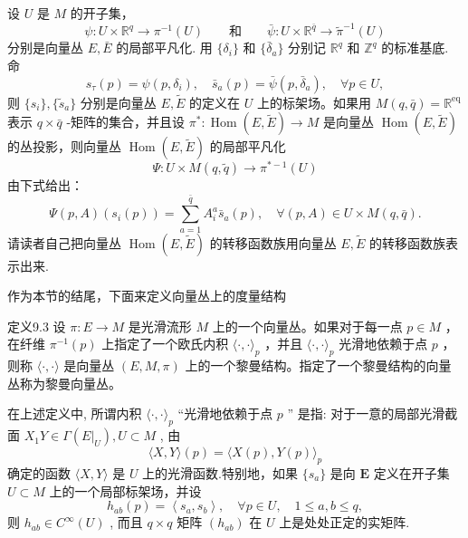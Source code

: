 设  $U$  是  $M$  的开子集，
$$
\psi : U \times \mathbb {R} ^ {q} \to \pi^ {- 1} (U) \qquad {\text {和}} \qquad \bar {\psi}: U \times \mathbb {R} ^ {\bar {q}} \to \tilde {\pi} ^ {- 1} (U)
$$
分别是向量丛  $E, \bar{E}$  的局部平凡化. 用  $\{\delta_i\}$  和  $\{\bar{\delta}_a\}$  分别记  $\mathbb{R}^q$  和  $\mathbb{Z}^q$  的标准基底. 命
$$
s _ {\tau} (p) = \psi (p, \delta_ {i}), \quad \bar {s} _ {a} (p) = \bar {\psi} (p, \bar {\delta} _ {a}), \quad \forall p \in U,
$$
则  $\{s_i\}, \{\tilde{s}_a\}$  分别是向量丛  $E, \tilde{E}$  的定义在  $U$  上的标架场。如果用  $M(q, \bar{q}) = \mathbb{R}^{\mathrm{eq}}$  表示  $q \times \bar{q}$ -矩阵的集合，并且设  $\pi^{*}: \operatorname{Hom}(E, \tilde{E}) \to M$  是向量丛  $\operatorname{Hom}(E, \tilde{E})$  的丛投影，则向量丛  $\operatorname{Hom}(E, \tilde{E})$  的局部平凡化
$$
\Psi : U \times M (q, \tilde {q}) \rightarrow \pi^ {* - 1} (U)
$$
由下式给出：
$$
\Psi (p, A) (s _ {i} (p)) = \sum_ {a = 1} ^ {\bar {q}} A _ {i} ^ {a} \bar {s} _ {a} (p), \quad \forall (p, A) \in U \times M (q, \bar {q}).
$$
请读者自己把向量丛  $\operatorname{Hom}(E, \tilde{E})$  的转移函数族用向量丛  $E, \tilde{E}$  的转移函数族表示出来.

作为本节的结尾，下面来定义向量丛上的度量结构

定义9.3 设  $\pi: E \to M$  是光滑流形  $M$  上的一个向量丛。如果对于每一点  $p \in M$ ，在纤维  $\pi^{-1}(p)$  上指定了一个欧氏内积  $\langle \cdot, \cdot \rangle_{p}$ ，并且  $\langle \cdot, \cdot \rangle_{p}$  光滑地依赖于点  $p$ ，则称  $\langle \cdot, \cdot \rangle$  是向量丛  $(E, M, \pi)$  上的一个黎曼结构。指定了一个黎曼结构的向量丛称为黎曼向量丛。

在上述定义中, 所谓内积  $\langle \cdot, \cdot \rangle_{p}$  “光滑地依赖于点  $p$ ” 是指: 对于一意的局部光滑截面  $X_{1}Y \in \Gamma(E|_{U}), U \subset M$ , 由
$$
\langle X, Y \rangle (p) = \langle X (p), Y (p) \rangle_ {p}
$$
确定的函数  $\langle X,Y\rangle$  是  $U$  上的光滑函数.特别地，如果  $\{s_a\}$  是向  $\pmb{E}$  定义在开子集  $U\subset M$  上的一个局部标架场，并设
$$
h _ {a b} (p) = \left\langle s _ {a}, s _ {b} \right\rangle , \quad \forall p \in U, \quad 1 \leqslant a, b \leqslant q,
$$
则  $h_{ab} \in C^{\infty}(U)$ , 而且  $q \times q$  矩阵  $(h_{ab})$  在  $U$  上是处处正定的实矩阵.